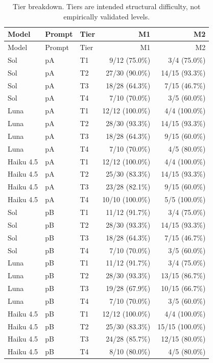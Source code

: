 \begingroup\small\setlength{\tabcolsep}{4pt}
\begin{longtable}{lllrr}
\caption{Tier breakdown. Tiers are intended structural difficulty, not empirically validated levels.}\\
\toprule
Model & Prompt & Tier & M1 & M2 \\
\midrule\endfirsthead
\toprule
Model & Prompt & Tier & M1 & M2 \\
\midrule\endhead
\bottomrule\endfoot
Sol & pA & T1 & 9/12 (75.0\%) & 3/4 (75.0\%) \\
Sol & pA & T2 & 27/30 (90.0\%) & 14/15 (93.3\%) \\
Sol & pA & T3 & 18/28 (64.3\%) & 7/15 (46.7\%) \\
Sol & pA & T4 & 7/10 (70.0\%) & 3/5 (60.0\%) \\
Luna & pA & T1 & 12/12 (100.0\%) & 4/4 (100.0\%) \\
Luna & pA & T2 & 28/30 (93.3\%) & 14/15 (93.3\%) \\
Luna & pA & T3 & 18/28 (64.3\%) & 9/15 (60.0\%) \\
Luna & pA & T4 & 7/10 (70.0\%) & 4/5 (80.0\%) \\
Haiku 4.5 & pA & T1 & 12/12 (100.0\%) & 4/4 (100.0\%) \\
Haiku 4.5 & pA & T2 & 25/30 (83.3\%) & 14/15 (93.3\%) \\
Haiku 4.5 & pA & T3 & 23/28 (82.1\%) & 9/15 (60.0\%) \\
Haiku 4.5 & pA & T4 & 10/10 (100.0\%) & 5/5 (100.0\%) \\
Sol & pB & T1 & 11/12 (91.7\%) & 3/4 (75.0\%) \\
Sol & pB & T2 & 28/30 (93.3\%) & 14/15 (93.3\%) \\
Sol & pB & T3 & 18/28 (64.3\%) & 7/15 (46.7\%) \\
Sol & pB & T4 & 7/10 (70.0\%) & 3/5 (60.0\%) \\
Luna & pB & T1 & 11/12 (91.7\%) & 3/4 (75.0\%) \\
Luna & pB & T2 & 28/30 (93.3\%) & 13/15 (86.7\%) \\
Luna & pB & T3 & 19/28 (67.9\%) & 10/15 (66.7\%) \\
Luna & pB & T4 & 7/10 (70.0\%) & 3/5 (60.0\%) \\
Haiku 4.5 & pB & T1 & 12/12 (100.0\%) & 4/4 (100.0\%) \\
Haiku 4.5 & pB & T2 & 25/30 (83.3\%) & 15/15 (100.0\%) \\
Haiku 4.5 & pB & T3 & 24/28 (85.7\%) & 12/15 (80.0\%) \\
Haiku 4.5 & pB & T4 & 8/10 (80.0\%) & 4/5 (80.0\%) \\
\end{longtable}\endgroup


